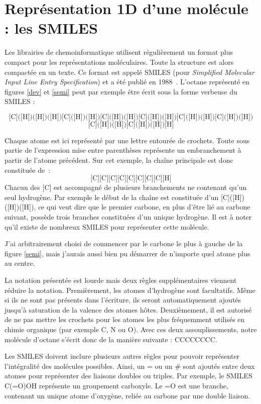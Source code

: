 \section{Représentation 1D d'une molécule : les SMILES}

Les librairies de chemoinformatique utilisent régulièrement un format plus compact pour les représentations moléculaires.
Toute la structure est alors compactée en un texte.
Ce format est appelé SMILES (pour \textit{Simplified Molecular Input Line Entry Specification}) et a été publié en 1988~\cite{weininger_smiles_1988}.
L'octane représenté en figures \ref{dev} et \ref{semi} peut par exemple être écrit sous la forme verbeuse du SMILES :

\[\text{[C]([H])([H])([H])[C]([H])([H])[C]([H])([H])[C]([H])([H])[C]([H])([H])[C]([H])([H])}\]
\[\text{[C]([H])([H])[C]([H])([H])[H]}\]

Chaque atome est ici représenté par une lettre entourée de crochets.
Toute sous partie de l'expression mise entre parenthèses représente un embranchement à partir de l'atome précédent.
Sur cet exemple, la chaîne principale est donc constituée de~:
\[\text{[C][C][C][C][C][C][C][C][H]}\]
Chacun des [C] est accompagné de plusieurs branchements ne contenant qu'un seul hydrogène.
Par exemple le début de la chaîne est constituée d'un [C]([H])([H])([H]), ce qui veut dire que le premier carbone, en plus d'être lié au carbone suivant, possède trois branches constituées d'un unique hydrogène.
Il est à noter qu'il existe de nombreux SMILES pour représenter cette molécule.

J'ai arbitrairement choisi de commencer par le carbone le plus à gauche de la figure \ref{semi}, mais j'aurais aussi bien pu démarrer de n'importe quel atome plus au centre.

La notation présentée est lourde mais deux règles supplémentaires viennent réduire la notation.
Premièrement, les atomes d'hydrogène sont facultatifs.
Même si ils ne sont pas présents dans l'écriture, ils seront automatiquement ajoutés jusqu'à saturation de la valence des atomes hôtes.
Deuxièmement, il est autorisé de ne pas mettre les crochets pour les atomes les plus fréquemment utilisés en chimie organique (par exemple C, N ou O).
Avec ces deux assouplissements, notre molécule d'octane s'écrit donc de la manière suivante : CCCCCCCC.

Les SMILES doivent inclure plusieurs autres règles pour pouvoir représenter l'intégralité des molécules possibles.
Ainsi, un = ou un \# sont ajoutés entre deux atomes pour représenter des liaisons doubles ou triples.
Par exemple, le SMILES C(=O)OH représente un groupement carboxyle.
Le =O est une branche, contenant un unique atome d'oxygène, reliée au carbone par une double liaison.

